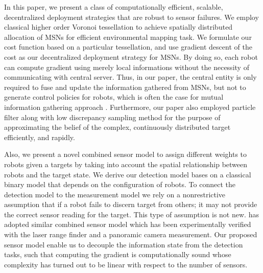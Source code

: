 \documentclass[letterpaper, 10 pt, conference]{ieeeconf}
\begin{document}



In this paper, we present a class of computationally efficient, scalable, decentralized deployment strategies that are robust to sensor failures. 
We employ classical higher order Voronoi tessellation \cite{shamos1975closest} to achieve spatially distributed allocation of MSNs for efficient environmental mapping task.  We formulate our cost function based on a particular tessellation, and use gradient descent of the cost as our decentralized deployment strategy for MSNs. By doing so, each robot can compute gradient using merely local informations without the necessity of communicating with central server.
Thus, in our paper, the central entity is only required to fuse and update the information gathered from MSNs, but not to generate control policies for robots, which is often the case for mutual information gathering approach \cite{schwager2017multi,julian2012distributed}. Furthermore, our paper also employed particle filter along with low discrepancy sampling method for the purpose of approximating the belief of the complex, continuously distributed target efficiently, and rapidly.

Also, we present a novel combined sensor model to assign different weights to robots given a targets by taking into account the spatial relationship between robots and the target state. We derive our detection model bases on a classical binary model \cite{viswanathan1997distributed,djuric2008target} that depends on the configuration of robots. To connect the detection model to the measurement model we rely on a nonrestrictive assumption that if a robot fails to discern target from others; it may not provide the correct sensor reading for the target. This type of assumption is not new. \cite{anguelov2004detecting} has adopted similar combined sensor model which has been experimentally verified with the  laser range finder and a panoramic camera measurement. Our proposed sensor model enable us to decouple the information state from the detection tasks, such that computing the gradient is computationally sound whose complexity has turned out to be linear with respect to the number of sensors. 
\end{document}
